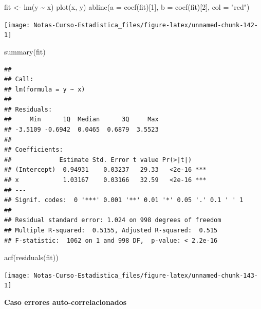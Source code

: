 \documentclass[
  12pt,
]{book}
\newenvironment{Shaded}{\begin{snugshade}}{\end{snugshade}}
\newcommand{\AttributeTok}[1]{\textcolor[rgb]{0.77,0.63,0.00}{#1}}
\newcommand{\DecValTok}[1]{\textcolor[rgb]{0.00,0.00,0.81}{#1}}
\newcommand{\FunctionTok}[1]{\textcolor[rgb]{0.00,0.00,0.00}{#1}}
\newcommand{\NormalTok}[1]{#1}
\newcommand{\OtherTok}[1]{\textcolor[rgb]{0.56,0.35,0.01}{#1}}
\newcommand{\SpecialCharTok}[1]{\textcolor[rgb]{0.00,0.00,0.00}{#1}}
\newcommand{\StringTok}[1]{\textcolor[rgb]{0.31,0.60,0.02}{#1}}
\begin{document}
\begin{Shaded}
\begin{Highlighting}[]
\NormalTok{fit }\OtherTok{\textless{}{-}} \FunctionTok{lm}\NormalTok{(y }\SpecialCharTok{\textasciitilde{}}\NormalTok{ x)}
\FunctionTok{plot}\NormalTok{(x, y)}
\FunctionTok{abline}\NormalTok{(}\AttributeTok{a =} \FunctionTok{coef}\NormalTok{(fit)[}\DecValTok{1}\NormalTok{], }\AttributeTok{b =} \FunctionTok{coef}\NormalTok{(fit)[}\DecValTok{2}\NormalTok{], }\AttributeTok{col =} \StringTok{"red"}\NormalTok{)}
\end{Highlighting}
\end{Shaded}

\begin{center}\texttt{[image: Notas-Curso-Estadistica\_files/figure-latex/unnamed-chunk-142-1]} \end{center}

\begin{Shaded}
\begin{Highlighting}[]
\FunctionTok{summary}\NormalTok{(fit)}
\end{Highlighting}
\end{Shaded}

\begin{verbatim}
## 
## Call:
## lm(formula = y ~ x)
## 
## Residuals:
##     Min      1Q  Median      3Q     Max 
## -3.5109 -0.6942  0.0465  0.6879  3.5523 
## 
## Coefficients:
##             Estimate Std. Error t value Pr(>|t|)    
## (Intercept)  0.94931    0.03237   29.33   <2e-16 ***
## x            1.03167    0.03166   32.59   <2e-16 ***
## ---
## Signif. codes:  0 '***' 0.001 '**' 0.01 '*' 0.05 '.' 0.1 ' ' 1
## 
## Residual standard error: 1.024 on 998 degrees of freedom
## Multiple R-squared:  0.5155, Adjusted R-squared:  0.515 
## F-statistic:  1062 on 1 and 998 DF,  p-value: < 2.2e-16
\end{verbatim}

\begin{Shaded}
\begin{Highlighting}[]
\FunctionTok{acf}\NormalTok{(}\FunctionTok{residuals}\NormalTok{(fit))}
\end{Highlighting}
\end{Shaded}

\begin{center}\texttt{[image: Notas-Curso-Estadistica\_files/figure-latex/unnamed-chunk-143-1]} \end{center}

\textbf{Caso errores auto-correlacionados}
\end{document}
